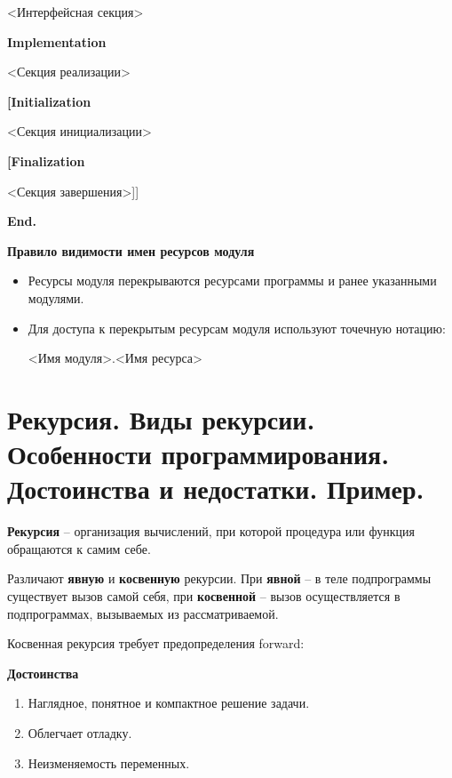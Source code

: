        <Интерфейсная секция>

{\bf Implementation}

       <Секция реализации>

{\bf [Initialization}

       <Секция инициализации>

{\bf [Finalization}

       <Секция завершения>]]
       
{\bf End. }

{\bf Правило видимости имен ресурсов модуля}

\begin{itemize}
\item Ресурсы модуля перекрываются ресурсами программы и ранее указанными модулями.

\item Для доступа к перекрытым ресурсам модуля используют точечную нотацию: 

	<Имя модуля>.<Имя ресурса>

\end{itemize}





\newpage\section{Рекурсия.  Виды  рекурсии.  Особенности  программирования. Достоинства  и  недостатки. 
Пример. }

\begin{myquote}
            
\end{myquote}


{\bf Рекурсия} – организация вычислений, при которой процедура или функция обращаются к самим себе.

Различают {\bf явную} и {\bf косвенную} рекурсии. При {\bf{явной}} – в теле подпрограммы существует вызов самой себя, при {\bf{косвенной}} – вызов осуществляется в подпрограммах, вызываемых из рассматриваемой.

Косвенная рекурсия требует предопределения forward:


{\bf Достоинства} 
\begin{enumerate}
\item Наглядное, понятное и компактное решение задачи.
\item Облегчает отладку.
\item Неизменяемость переменных.
\end{enumerate}


